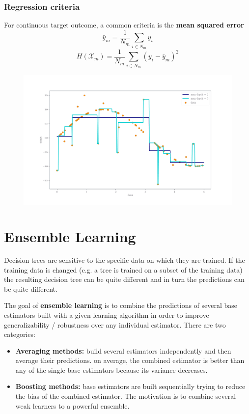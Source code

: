 \documentclass[11pt]{article}
\theoremstyle{plain}
\theoremstyle{definition}
\begin{document}
\subsubsection{Regression criteria}
For continuous target outcome, a common criteria is the \textbf{mean squared error}
\begin{equation}
\bar{y}_m = \frac{1}{N_m} \sum_{i\in N_m} y_i
\end{equation}
\begin{equation}
H(\mathcal{X}_m) = \frac{1}{N_m} \sum_{i\in N_m} (y_i - \bar{y}_m)^2
\end{equation}
\begin{figure}[h!]
	\includegraphics[width=\linewidth]{./img/tree_regression.pdf}
\end{figure}




\section{Ensemble Learning}
Decision trees are sensitive to the specific data on which they are trained. If the training data is changed (e.g. a tree is trained on a subset of the training data) the resulting decision tree can be quite different and in turn the predictions can be quite different.

The goal of \textbf{ensemble learning} is to combine the predictions of several base estimators built with a given learning algorithm in order to improve generalizability / robustness over any individual estimator. There are two categories:
\begin{itemize}
	\item \textbf{Averaging methods:} build several estimators independently and then average their predictions. on average, the combined estimator is better than any of the single base estimators because its variance decreases.
	\item \textbf{Boosting methods:} base estimators are built sequentially trying to reduce the bias of the combined estimator. The motivation is to combine several weak learners to a powerful ensemble.
\end{itemize}
\end{document}
